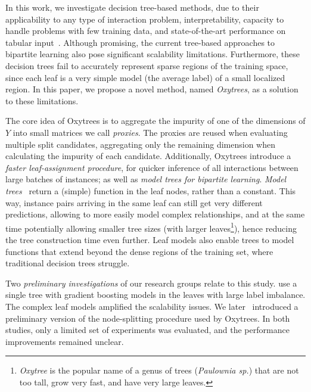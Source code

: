 \documentclass[letterpaper]{article}
\begin{document}
In this work, we investigate decision tree-based methods, due to their applicability to any type of interaction problem,
interpretability, capacity to handle problems with few training data, and state-of-the-art performance on tabular input~\cite{grinsztajn_why_2022,costa2023recent,blockeel2023decision}. Although promising, the current tree-based approaches to bipartite learning also pose significant scalability limitations. Furthermore, these decision trees fail to accurately represent sparse regions of the training space, since each leaf is a very simple model (the average label) of a small localized region.
% 
In this paper, we propose a novel method, named \emph{Oxytrees}, as a solution to these limitations.


The core idea of Oxytrees is to aggregate the impurity of one of the dimensions of $Y$ into small matrices we call \textit{proxies}. The proxies are reused when evaluating multiple split candidates, aggregating only the remaining dimension when calculating the impurity of each candidate.
Additionally, Oxytrees introduce 
a \emph{faster leaf-assignment procedure}, for quicker inference of all interactions between large batches of instances; as well as
\emph{model trees for bipartite learning}.
\emph{Model trees}~\cite{quinlan1992learning,landwehr_logistic_2005,costa2023recent} return a (simple) function in the leaf nodes, rather than a constant.
This way, instance pairs arriving in the same leaf can still get very different predictions, allowing to more easily model complex relationships, and at the same time potentially allowing smaller tree sizes (with larger leaves\footnote{\textit{Oxytree} is the popular name of a genus of trees (\textit{Paulownia sp.}) that are not too tall, grow very fast, and have very large leaves.}), hence reducing the tree construction time even further.
Leaf models also enable trees to model functions that extend beyond the dense regions of the training set, where traditional decision trees struggle.

Two \emph{preliminary investigations} of our research groups relate to this study. \citet{alves2022twostep} use a single tree with gradient boosting models in the leaves with large label imbalance. The complex leaf models amplified the scalability issues.
We later~\cite{ilidio_fast_2024} introduced a preliminary version of the node-splitting procedure used by Oxytrees. In both studies, only a limited set of experiments was evaluated, and the performance improvements remained unclear.
\end{document}
